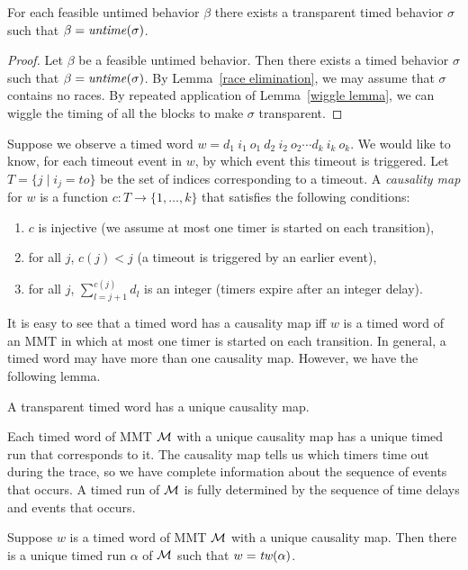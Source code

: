 \begin{lemma}
\label{lemma: transparent timed behavior}
For each feasible untimed behavior $\beta$ there exists
a transparent timed behavior $\sigma$ such that $\beta = \mathit{untime}(\sigma)$.
\end{lemma}
\iflong
\begin{proof}
Let $\beta$ be a feasible untimed behavior.
Then there exists a timed behavior $\sigma$ such that $\beta = \mathit{untime}(\sigma)$.
By Lemma~\ref{race elimination}, we may assume that $\sigma$ contains no races.
By repeated application of Lemma~\ref{wiggle lemma}, we can wiggle the timing of all the blocks to make $\sigma$ transparent.
\end{proof}
\fi

Suppose we observe a timed word
$w  =   d_1 ~ i_1 ~ o_1 ~ d_2 ~ i_2 ~ o_2 \cdots d_k ~ i_k ~ o_k$.
We would like to know, for each timeout event in $w$, by which event this timeout is triggered.
Let $T = \{ j \mid i_j = \mathit{to} \}$ be the set of indices corresponding to a timeout.
A \emph{causality map} for $w$ is a function $c: T \rightarrow \{ 1 ,\ldots, k \}$ that satisfies the following conditions:
\begin{enumerate}
\item
$c$ is injective (we assume at most one timer is started on each transition),
\item
for all $j$, $c(j) < j$ (a timeout is triggered by an earlier event),
\item
for all $j$, $\sum_{l=j+1}^{c(j)} d_l$ is an integer (timers expire after an integer delay).
\end{enumerate}
It is easy to see that a timed word has a causality map iff $w$ is a timed word of an MMT in which at most one timer
is started on each transition. In general, a timed word may have more than one causality map.
 However, we have the following
lemma.

\begin{lemma}
\label{lemma unique causality map}
A transparent timed word has a unique causality map.
\end{lemma}

Each timed word of MMT ${\cal M}$ with a unique causality map has a unique timed run that corresponds to it.
The causality map tells us which timers time out during the trace, so we have complete information
about the sequence of events that occurs. 
\iflong
A timed run of ${\cal M}$ is fully determined
by the sequence of time delays and events that occurs.

\begin{lemma}
\label{lemma unique timed run}
Suppose $w$ is a timed word of MMT ${\cal M}$ with a unique causality map.
Then there is a unique timed run $\alpha$ of ${\cal M}$ such that $w = \mathit{tw}(\alpha)$.
\end{lemma}

